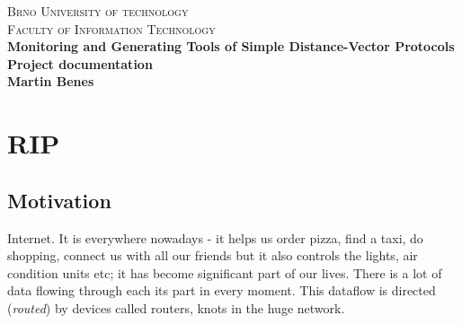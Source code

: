 \documentclass[10pt,a4paper,titlepage]{article}
\begin{document}
    
    \begin{titlepage}
    \begin{center}
        \textsc{\LARGE Brno University of technology}\\[0.5cm]
        \textsc{\large Faculty of Information Technology}\\[8cm]
    
        { \huge \bfseries Monitoring and Generating Tools of Simple Distance-Vector Protocols}\\[0.3cm]
        { \Large \bfseries Project documentation}\\[0.5cm]
        { \bfseries Martin Benes}\\
    
    \end{center} 
    \end{titlepage}
    
    \newpage
    
    
    \section*{RIP}

        \subsection*{Motivation}
            Internet. It is everywhere nowadays - it helps us order pizza, find a taxi, do shopping,
            connect us with all our friends but it also controls the lights, air condition units etc;
            it has become significant part of our lives. There is a lot of data flowing through each
            its part in every moment. This dataflow is directed ({\it routed}) by devices called routers,
            knots in the huge network.
\end{document}

